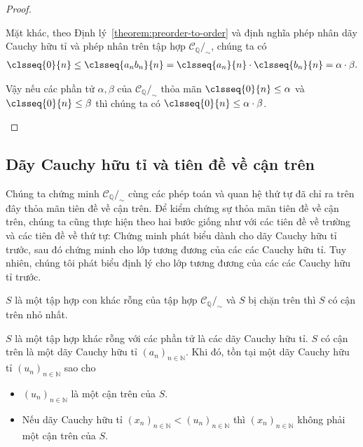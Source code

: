 \begin{proof}
\begin{enumerate}[label={(\roman*)}]
              Mặt khác, theo Định lý~\ref{theorem:preorder-to-order} và định nghĩa phép nhân dãy Cauchy hữu tỉ và phép nhân trên tập hợp $\mathscr{C}_{\mathbb{Q}}/_{\sim}$, chúng ta có
              \begin{align*}
                  \clsseq{0}{n} \leq \clsseq{a_{n}b_{n}}{n} = \clsseq{a_{n}}{n}\cdot\clsseq{b_{n}}{n} = \alpha\cdot\beta.
              \end{align*}

              Vậy nếu các phần tử $\alpha, \beta$ của $\mathscr{C}_{\mathbb{Q}}/_{\sim}$ thỏa mãn $\clsseq{0}{n} \leq \alpha$ và $\clsseq{0}{n}\leq \beta$ thì chúng ta có $\clsseq{0}{n}\leq \alpha\cdot\beta$.
    \end{enumerate}
\end{proof}

\subsection{Dãy Cauchy hữu tỉ và tiên đề về cận trên}

Chúng ta chứng minh $\mathscr{C}_{\mathbb{Q}}/_{\sim}$ cùng các phép toán và quan hệ thứ tự đã chỉ ra trên đây thỏa mãn tiên đề về cận trên. Để kiểm chứng sự thỏa mãn tiên đề về cận trên, chúng ta cũng thực hiện theo hai bước giống như với các tiên đề về trường và các tiên đề về thứ tự: Chứng minh phát biểu dành cho dãy Cauchy hữu tỉ trước, sau đó chứng minh cho lớp tương đương của các các Cauchy hữu tỉ. Tuy nhiên, chúng tôi phát biểu định lý cho lớp tương đương của các các Cauchy hữu tỉ trước.

\begin{theorem}\label{theorem:equivalence-class-cauchy-sequence-and-the-axioms-of-completeness}
    $S$ là một tập hợp con khác rỗng của tập hợp $\mathscr{C}_{\mathbb{Q}}/_{\sim}$ và $S$ bị chặn trên thì $S$ có cận trên nhỏ nhất.
\end{theorem}

\begin{theorem}\label{theorem:cauchy-sequence-and-the-axioms-of-completeness}
    $S$ là một tập hợp khác rỗng với các phần tử là các dãy Cauchy hữu tỉ. $S$ có cận trên là một dãy Cauchy hữu tỉ ${(a_{n})}_{n\in\mathbb{N}}$. Khi đó, tồn tại một dãy Cauchy hữu tỉ ${(u_{n})}_{n\in\mathbb{N}}$ sao cho
    \begin{itemize}
        \item ${(u_{n})}_{n\in\mathbb{N}}$ là một cận trên của $S$.
        \item Nếu dãy Cauchy hữu tỉ ${(x_{n})}_{n\in\mathbb{N}} < {(u_{n})}_{n\in\mathbb{N}}$ thì ${(x_{n})}_{n\in\mathbb{N}}$ không phải một cận trên của $S$.
    \end{itemize}
\end{theorem}


